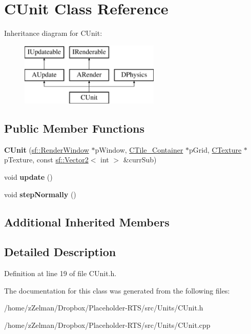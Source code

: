 \hypertarget{classCUnit}{\section{C\-Unit Class Reference}
\label{classCUnit}
}
Inheritance diagram for C\-Unit\-:\begin{figure}[H]
\begin{center}
\leavevmode
\includegraphics[height=3.000000cm]{classCUnit}
\end{center}
\end{figure}
\subsection*{Public Member Functions}
\begin{DoxyCompactItemize}
\item 
\hypertarget{classCUnit_a9f9ab7bd01cc51912ba5aa92520c858a}{{\bfseries C\-Unit} (\hyperlink{classsf_1_1RenderWindow}{sf\-::\-Render\-Window} $\ast$p\-Window, \hyperlink{classCTile__Container}{C\-Tile\-\_\-\-Container} $\ast$p\-Grid, \hyperlink{classCTexture}{C\-Texture} $\ast$p\-Texture, const \hyperlink{classsf_1_1Vector2}{sf\-::\-Vector2}$<$ int $>$ \&curr\-Sub)}\label{classCUnit_a9f9ab7bd01cc51912ba5aa92520c858a}

\item 
\hypertarget{classCUnit_a8669992f78b1955874c14e66963f9752}{void {\bfseries update} ()}\label{classCUnit_a8669992f78b1955874c14e66963f9752}

\item 
\hypertarget{classCUnit_a3de88566a8ecfac18309859cf7282da2}{void {\bfseries step\-Normally} ()}\label{classCUnit_a3de88566a8ecfac18309859cf7282da2}

\end{DoxyCompactItemize}
\subsection*{Additional Inherited Members}


\subsection{Detailed Description}


Definition at line 19 of file C\-Unit.\-h.



The documentation for this class was generated from the following files\-:\begin{DoxyCompactItemize}
\item 
/home/z\-Zelman/\-Dropbox/\-Placeholder-\/\-R\-T\-S/src/\-Units/C\-Unit.\-h\item 
/home/z\-Zelman/\-Dropbox/\-Placeholder-\/\-R\-T\-S/src/\-Units/C\-Unit.\-cpp\end{DoxyCompactItemize}
